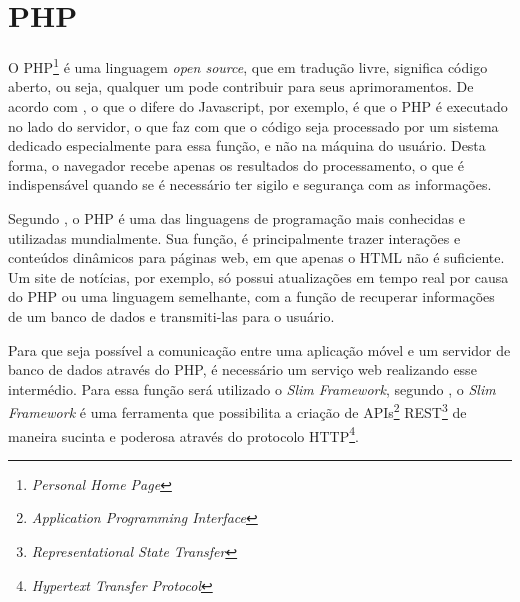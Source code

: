 \section{PHP}
	\par O PHP\footnote{\textit{Personal Home Page}} é uma linguagem \textit{open source}, que em tradução livre, significa código aberto, ou seja, qualquer um pode contribuir para seus aprimoramentos. De acordo com , o que o difere do Javascript, por exemplo, é que o PHP é executado no lado do servidor, o que faz com que o código seja processado por um sistema dedicado especialmente para essa função, e não na máquina do usuário. Desta forma, o navegador recebe apenas os resultados do processamento, o que é indispensável quando se é necessário ter sigilo e segurança com as informações.
	\par Segundo , o PHP é uma das linguagens de programação mais conhecidas e utilizadas mundialmente. Sua função, é principalmente trazer interações e conteúdos dinâmicos para páginas web, em que apenas o HTML não é suficiente. Um site de notícias, por exemplo, só possui atualizações em tempo real por causa do PHP ou uma linguagem semelhante, com a função de recuperar informações de um banco de dados e transmiti-las para o usuário.
	\par Para que seja possível a comunicação entre uma aplicação móvel e um servidor de banco de dados através do PHP, é necessário um serviço web realizando esse intermédio. Para essa função será utilizado o \textit{Slim Framework}, segundo , o \textit{Slim Framework} é uma ferramenta que possibilita a criação de APIs\footnote{\textit{Application Programming Interface}} REST\footnote{\textit{Representational State Transfer}} de maneira sucinta e poderosa através do protocolo HTTP\footnote{\textit{Hypertext Transfer Protocol}}.
	
